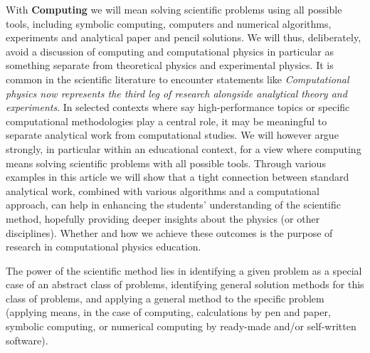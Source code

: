\documentclass[graybox,envcountchap,sectrefs]{svmult}
\begin{document}
With \textbf{Computing } we will mean solving scientific problems using all
possible tools, including symbolic computing, computers and numerical
algorithms, experiments and analytical paper and pencil solutions. We
will thus, deliberately, avoid a discussion of computing  and
computational physics in particular as something separate from
theoretical physics and experimental physics.  It is common in the
scientific literature to encounter statements like \emph{Computational
physics now represents the third leg of research alongside analytical
theory and experiments}. In selected contexts where say
high-performance topics or specific computational methodologies play a
central role, it may be meaningful to separate analytical work from
computational studies. We will however argue strongly, in particular within an educational context,
for a view where
computing  means solving scientific problems with all possible
tools. Through various examples in this article we will show that a
tight connection between standard analytical work, combined with
various algorithms and a computational approach, can help in enhancing the
students' understanding of the scientific method, hopefully providing
deeper insights about the physics (or other disciplines). Whether and how we achieve these outcomes is the purpose of research in computational physics education.

The power of the scientific method lies in identifying a given problem
as a special case of an abstract class of problems, identifying
general solution methods for this class of problems, and applying a
general method to the specific problem (applying means, in the case of
computing, calculations by pen and paper, symbolic computing, or
numerical computing  by ready-made and/or self-written software).
\end{document}
